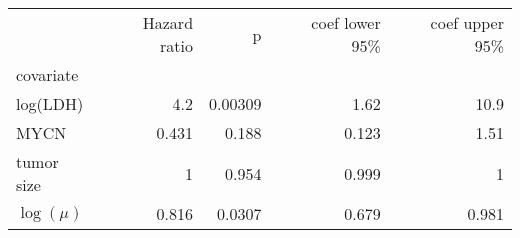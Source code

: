 \begin{tabular}{lrrrr}
\toprule
{} &  Hazard ratio &       p &  coef lower 95\% &  coef upper 95\% \\
covariate   &               &         &                  &                  \\
\midrule
log(LDH)    &           4.2 & 0.00309 &             1.62 &             10.9 \\
MYCN        &         0.431 &   0.188 &            0.123 &             1.51 \\
tumor size  &             1 &   0.954 &            0.999 &                1 \\
$\log(\mu)$ &         0.816 &  0.0307 &            0.679 &            0.981 \\
\bottomrule
\end{tabular}
